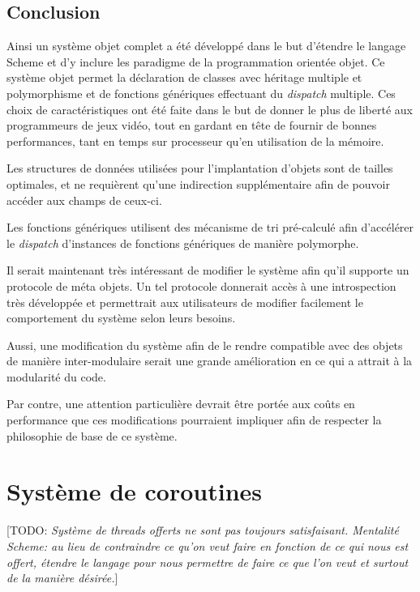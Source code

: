 \documentclass[12pt,oneside,letterpaper,francais]{book}
\newcommand{\todo}[1]{[TODO: {\it #1}]}
\begin{document}
\section{Conclusion}
Ainsi un système objet complet a été développé dans le but d'étendre
le langage Scheme et d'y inclure les paradigme de la programmation
orientée objet. Ce système objet permet la déclaration de classes avec
héritage multiple et polymorphisme et de fonctions génériques
effectuant du \textit{dispatch} multiple. Ces choix de
caractéristiques ont été faite dans le but de donner le plus de
liberté aux programmeurs de jeux vidéo, tout en gardant en tête de
fournir de bonnes performances, tant en temps sur processeur qu'en
utilisation de la mémoire.

Les structures de données utilisées pour l'implantation d'objets sont
de tailles optimales, et ne requièrent qu'une indirection
supplémentaire afin de pouvoir accéder aux champs de ceux-ci. 

Les fonctions génériques utilisent des mécanisme de tri pré-calculé
afin d'accélérer le \textit{dispatch} d'instances de fonctions
génériques de manière polymorphe. 

Il serait maintenant très intéressant de modifier le système afin
qu'il supporte un protocole de méta objets. Un tel protocole donnerait
accès à une introspection très développée et permettrait aux
utilisateurs de modifier facilement le comportement du système selon
leurs besoins. 

Aussi, une modification du système afin de le rendre compatible avec
des objets de manière inter-modulaire serait une grande amélioration
en ce qui a attrait à la modularité du code. 

Par contre, une attention particulière devrait être portée aux coûts
en performance que ces modifications pourraient impliquer afin de
respecter la philosophie de base de ce système.



\chapter{Système de coroutines}
\todo{Système de threads offerts ne sont pas toujours
  satisfaisant. Mentalité Scheme: au lieu de contraindre ce qu'on veut
  faire en fonction de ce qui nous est offert, étendre le langage pour
  nous permettre de faire ce que l'on veut et surtout de la manière
  désirée.}
\end{document}

